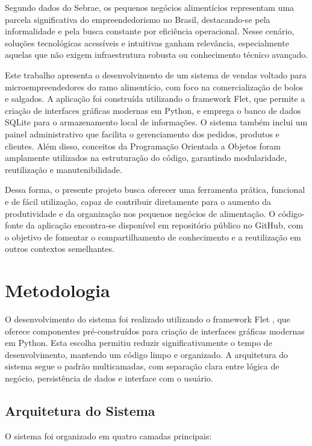 \documentclass[conference]{IEEEtran}
\begin{document}
Segundo dados do Sebrae, os pequenos negócios alimentícios representam uma parcela significativa do empreendedorismo no Brasil, destacando-se pela informalidade e pela busca constante por eficiência operacional. Nesse cenário, soluções tecnológicas acessíveis e intuitivas ganham relevância, especialmente aquelas que não exigem infraestrutura robusta ou conhecimento técnico avançado.

Este trabalho apresenta o desenvolvimento de um sistema de vendas voltado para microempreendedores do ramo alimentício, com foco na comercialização de bolos e salgados. A aplicação foi construída utilizando o framework Flet, que permite a criação de interfaces gráficas modernas em Python, e emprega o banco de dados SQLite para o armazenamento local de informações. O sistema também inclui um painel administrativo que facilita o gerenciamento dos pedidos, produtos e clientes. Além disso, conceitos da Programação Orientada a Objetos foram amplamente utilizados na estruturação do código, garantindo modularidade, reutilização e manutenibilidade.

Dessa forma, o presente projeto busca oferecer uma ferramenta prática, funcional e de fácil utilização, capaz de contribuir diretamente para o aumento da produtividade e da organização nos pequenos negócios de alimentação. O código-fonte da aplicação encontra-se disponível em repositório público no GitHub, com o objetivo de fomentar o compartilhamento de conhecimento e a reutilização em outros contextos semelhantes.

\section{Metodologia}

O desenvolvimento do sistema foi realizado utilizando o framework Flet \cite{flet}, que oferece componentes pré-construídos para criação de interfaces gráficas modernas em Python. Esta escolha permitiu reduzir significativamente o tempo de desenvolvimento, mantendo um código limpo e organizado. A arquitetura do sistema segue o padrão multicamadas, com separação clara entre lógica de negócio, persistência de dados e interface com o usuário.

\subsection{Arquitetura do Sistema}
O sistema foi organizado em quatro camadas principais:
\end{document}
